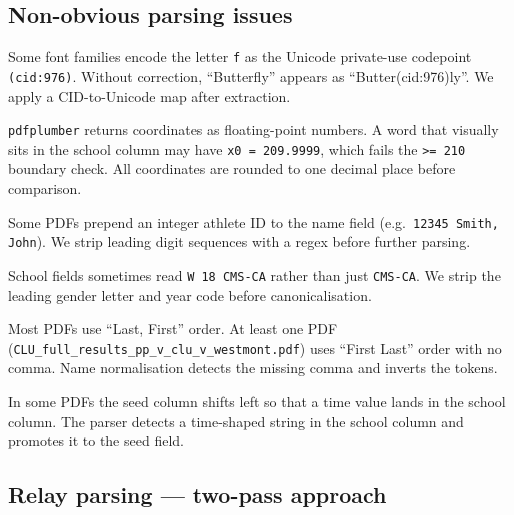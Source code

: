\documentclass{article}
\begin{document}
\subsection*{Non-obvious parsing issues}

\begin{description}[noitemsep]
  \item[CID ligatures.]
    Some font families encode the letter \texttt{f} as the Unicode private-use
    codepoint \texttt{(cid:976)}. Without correction, ``Butterfly'' appears as
    ``Butter(cid:976)ly''. We apply a CID-to-Unicode map after extraction.

  \item[Floating-point column boundary.]
    \texttt{pdfplumber} returns coordinates as floating-point numbers.
    A word that visually sits in the school column may have
    \texttt{x0 = 209.9999}, which fails the \texttt{>= 210} boundary check.
    All coordinates are rounded to one decimal place before comparison.

  \item[Athlete ID prefix.]
    Some PDFs prepend an integer athlete ID to the name field
    (e.g.\ \texttt{12345 Smith, John}). We strip leading digit sequences with
    a regex before further parsing.

  \item[Gender/year prefix in school field.]
    School fields sometimes read \texttt{W 18 CMS-CA} rather than just
    \texttt{CMS-CA}. We strip the leading gender letter and year code before
    canonicalisation.

  \item[``First Last'' name order.]
    Most PDFs use ``Last, First'' order. At least one PDF
    (\texttt{CLU\_full\_results\_pp\_v\_clu\_v\_westmont.pdf}) uses
    ``First Last'' order with no comma. Name normalisation detects the missing
    comma and inverts the tokens.

  \item[Seed column shift.]
    In some PDFs the seed column shifts left so that a time value lands in
    the school column. The parser detects a time-shaped string in the school
    column and promotes it to the seed field.
\end{description}

\subsection*{Relay parsing --- two-pass approach}
\end{document}
